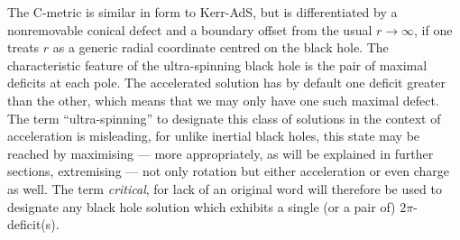 \documentclass[
twoside,
openright,
frontopenright,
]{dmathesis}
\begin{document}
The C-metric is similar in form to Kerr-AdS, but is differentiated by a
nonremovable conical defect and a boundary offset from the usual $r\to\infty$,
if one treats $r$ as a generic radial coordinate centred on the black hole. The
characteristic feature of the ultra-spinning black hole is the pair of maximal
deficits at each pole. The accelerated solution has by default one deficit
greater than the other, which means that we may only have one such maximal
defect. The term ``ultra-spinning'' to designate this class of solutions in the
context of acceleration is misleading, for unlike inertial black holes, this
state may be reached by maximising --- more appropriately, as will be explained
in further sections, extremising --- not only rotation but either acceleration
or even charge as well. The term \emph{critical}, for lack of an original word
will therefore be used to designate any black hole solution which exhibits a
single (or a pair of) $2\pi$-deficit(s).


\end{document}
